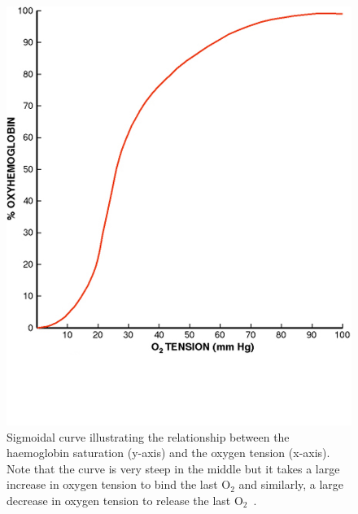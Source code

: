 	\begin{figure}
		\begin{center}
		\includegraphics[width=\textwidth]{./oemri_thesis1/oemri_thesis1-images/HBdis.png}
		\caption{Sigmoidal curve illustrating the relationship between the haemoglobin saturation (y-axis) and the oxygen tension (x-axis). Note that the curve is very steep in the middle but it takes a large increase in oxygen tension to bind the last O$_2$ and similarly, a large decrease in oxygen tension to release the last  O$_2$~\cite{GomezCambronero:2001hu}.}
		\label{HBdis}
		\end{center}
	\end{figure}	

